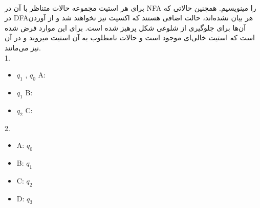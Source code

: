 
\\
{برای هر استیت مجموعه حالات متناظر با آن در NFA را مینویسیم.
همچنین حالاتی که در DFAهر بیان نشده‌اند، حالت اضافی هستند که اکسپت نیز نخواهند شد و از آوردن آن‌ها برای جلوگیری از شلوغی شکل پرهیز شده است. برای این موارد فرض شده است که استیت خالی‌ای  موجود است و حالات نامطلوب به آن استیت میروند و در آن نیز می‌مانند.
\\
1.
\begin{latin}
	\begin{itemize}
		\item
		{{$q_1$} , {$q_0$} }A:
		\item
		{ {$q_1$} }B:
		\item
		{ {$q_2$} }C:
	\end{itemize}
\end{latin}
\begin{center}
\end{center}

2.
\begin{latin}
	\begin{itemize}
	\item
 	A:{ {$q_0$} }
    \item
    B:{ {$q_1$} }
    \item
    C:{ {$q_2$} }
    \item
    D:{ {$q_3$} }
\end{itemize}
\end{latin}

}
